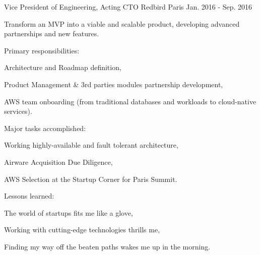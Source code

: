 \begin{cventries}
  \cventry
    {Vice President of Engineering, Acting CTO} %
    {Redbird} %
    {Paris} %
    {Jan. 2016 - Sep. 2016} %
    {
      \begin{cvitems} %
        \item {Transform an MVP into a viable and scalable product, developing advanced partnerships and new features.}
        \item {Primary responsibilities:} %
        \begin{cvsubitems}
          \item {Architecture and Roadmap definition,}
          \item {Product Management \& 3rd parties modules partnership development,}
          \item {AWS team onboarding (from traditional databases and workloads to cloud-native services).}
        \end{cvsubitems}
        \item {Major tasks accomplished:}
        \begin{cvsubitems}
          \item {Working highly-available and fault tolerant architecture,}
          \item {Airware Acquisition Due Diligence,}
          \item {AWS Selection at the Startup Corner for Paris Summit.}
        \end{cvsubitems}
        \item {Lessons learned:}
        \begin{cvsubitems}
          \item {The world of startups fits me like a glove,}
          \item {Working with cutting-edge technologies thrills me,}
          \item {Finding my way off the beaten paths wakes me up in the morning.}
        \end{cvsubitems}
      \end{cvitems}
    }


\end{cventries}
